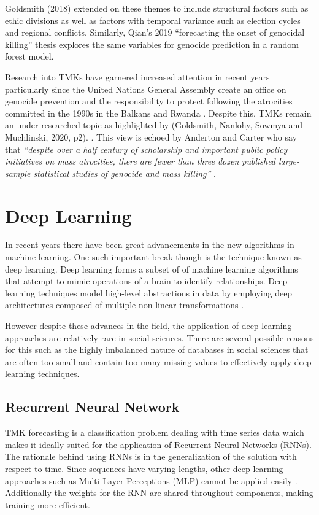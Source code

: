 Goldsmith (2018) \cite{Goldsmith2018} extended on these themes to include structural factors such as ethic divisions as well as factors with temporal variance such as election cycles and regional conflicts. Similarly, Qian's 2019 “forecasting the onset of genocidal killing” thesis \cite{EricQian} explores the same variables for genocide prediction in a random forest model.

Research into TMKs have garnered increased attention in recent years particularly since the United Nations General Assembly create an office on genocide prevention and the responsibility to protect following the atrocities committed in the 1990s in the Balkans and Rwanda \cite{unitednations}. Despite this, TMKs remain an under-researched topic as highlighted by (Goldsmith, Nanlohy, Sowmya and Muchlinski, 2020, p2). \cite{Goldsmith2018}. This view is echoed by Anderton and Carter who say that \emph{“despite over a half century of scholarship and important public policy initiatives on mass atrocities, there are fewer than three dozen published large-sample statistical studies of genocide and mass killing”} \cite{anderton}.  

\section{Deep Learning}
In recent years there have been great advancements in the new algorithms in machine learning. One such important break though is the technique known as deep learning. Deep learning forms a subset of of machine learning algorithms that attempt to mimic operations of a brain to identify relationships. Deep learning techniques model high-level abstractions in data by employing deep architectures composed of multiple non-linear transformations \cite{Berard}.

However despite these advances in the field, the application of deep learning approaches are relatively rare in social sciences. There are several possible reasons for this such as the highly imbalanced nature of databases in social sciences that are often too small and contain too many missing values to effectively apply deep learning techniques.

\subsection{Recurrent Neural Network}
TMK forecasting is a classification problem dealing with time series data which makes it ideally suited for the application of Recurrent Neural Networks (RNNs). The rationale behind using RNNs is in the generalization of the solution with respect to time. Since sequences have varying lengths, other deep learning approaches such as Multi Layer Perceptions (MLP) cannot be applied easily \cite{Aravind}. Additionally the weights for the RNN are shared throughout components, making training more efficient.


